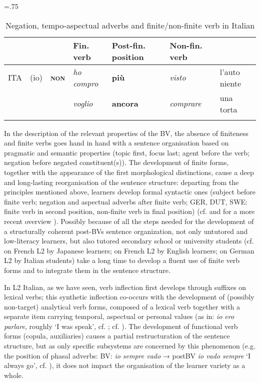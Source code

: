 \documentclass[output=paper]{langscibook}
\begin{document}
\begin{table}
\tabcolsep=.75\tabcolsep
\begin{tabular}{lllllll}
\lsptoprule
    &  &  & Fin. verb & Post-fin. position & \multicolumn{1}{l}{Non-fin. verb} & \\\midrule
ITA & (io) & {\bfseries\scshape non} & \textit{ho compro} & {\bfseries più} & \textit{visto} & l’auto niente\\
    &      &                         & \textit{voglio} & {\bfseries ancora} & {\itshape comprare} & una torta\\
\lspbottomrule
\end{tabular}
\caption{\label{tab:benazzo:7}Negation, tempo-aspectual adverbs and finite/non-finite verb in Italian}
\end{table}

In the description of the relevant properties of the BV, the absence of finiteness and finite verbs goes hand in hand with a sentence organisation based on pragmatic and semantic properties (topic first, focus last; agent before the verb; negation before negated constituent(s)). The development of finite forms, together with the appearance of the first morphological distinctions, cause a deep and long-lasting reorganisation of the sentence structure: departing from the principles mentioned above, learners develop formal syntactic ones (subject before finite verb; negation and aspectual adverbs after finite verb; GER, DUT, SWE: finite verb in second position, non-finite verb in final position) (cf.  and for a more recent overview \citealt{DimrothToappear}). Possibly because of all the steps needed for the development of a structurally coherent post-BVs sentence organization, not only untutored and low-literacy learners, but also tutored secondary school or university students (cf. \citealt{Kerrou2019} on French L2 by Japanese learners; \citealt{Granget2017} on French L2 by English learners; \citealt{Winkler2017} on German L2 by Italian students) take a long time to develop a fluent use of finite verb forms and to integrate them in the sentence structure. 

In L2 Italian, as we have seen, verb inflection first develops through suffixes on lexical verbs; this synthetic inflection co-occurs with the development of (possibly non-target) analytical verb forms, composed of a lexical verb together with a separate item carrying temporal, aspectual or personal values (as in: \textit{io ero parlare}, roughly ‘I was speak’, cf. \citealt{Bernini2003, Mocciaro2020}; cf. ). The development of functional verb forms (copula, auxiliaries) causes a partial restructuration of the sentence structure, but as only specific subsystems are concerned by this phenomenon (e.g. the position of phasal adverbs: BV: \textit{io sempre vado} → postBV \textit{io vado sempre} ‘I always go’, cf. \citealt{Andorno2005, Bernini2005}), it does not impact the organisation of the learner variety as a whole. 
\end{document}
